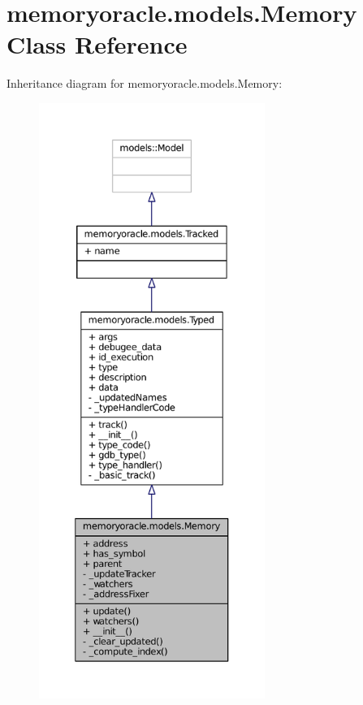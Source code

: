 \hypertarget{classmemoryoracle_1_1models_1_1Memory}{}\section{memoryoracle.\+models.\+Memory Class Reference}
\label{classmemoryoracle_1_1models_1_1Memory}


Inheritance diagram for memoryoracle.\+models.\+Memory\+:\nopagebreak
\begin{figure}[H]
\begin{center}
\leavevmode
\includegraphics[height=550pt]{classmemoryoracle_1_1models_1_1Memory__inherit__graph}
\end{center}
\end{figure}



